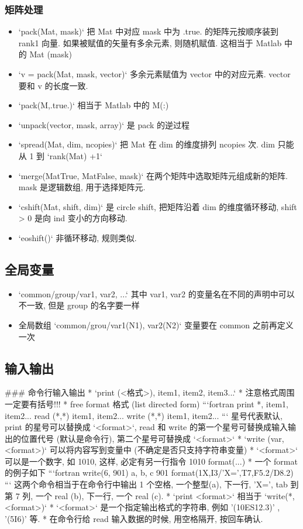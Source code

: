 \subsubsection{矩阵处理}
\begin{itemize}
\item `pack(Mat, mask)` 把 Mat 中对应 mask 中为 .true. 的矩阵元按顺序装到 rank1 向量. 如果被赋值的矢量有多余元素, 则随机赋值. 这相当于 Matlab 中的 Mat (mask)
\item `v = pack(Mat, mask, vector)` 多余元素赋值为 vector 中的对应元素. vector 要和 v 的长度一致.
\item `pack(M,.true.)` 相当于 Matlab 中的 M(:)
\item `unpack(vector, mask, array)` 是 pack 的逆过程
\item `spread(Mat, dim, ncopies)` 把 Mat 在 dim 的维度排列 ncopies 次. dim 只能从 1 到 `rank(Mat) +1`
\item `merge(MatTrue, MatFalse, mask)` 在两个矩阵中选取矩阵元组成新的矩阵. mask 是逻辑数组, 用于选择矩阵元.
\item `cshift(Mat, shift, dim)` 是 circle shift, 把矩阵沿着 dim 的维度循环移动, shift > 0 是向 ind 变小的方向移动.
\item `eoshift()` 非循环移动, 规则类似.
\end{itemize}

\subsection{全局变量}
\begin{itemize}
\item `common/group/var1, var2, ...` 其中 var1, var2 的变量名在不同的声明中可以不一致, 但是 group 的名字要一样
\item 全局数组 `common/grou/var1(N1), var2(N2)` 变量要在 common 之前再定义一次
\end{itemize}

\subsection{输入输出}

### 命令行输入输出
* `print (<格式>), item1, item2, item3...`
* 注意格式周围一定要有括号!!!
* free format 格式 (list directed form)
```fortran
   print *, item1, item2...
   read (*,*) item1, item2... 
   write (*,*) item1, item2...
```
   星号代表默认, print 的星号可以替换成 `<format>`, read 和 write 的第一个星号可替换成输入输出的位置代号 (默认是命令行), 第二个星号可替换成 `<format>`
* `write (var, <format>)` 可以将内容写到变量中 (不确定是否只支持字符串变量)
* `<format>` 可以是一个数字, 如 1010, 这样, 必定有另一行指令 1010 format(...)
* 一个 format 的例子如下
```fortran
write(6, 901) a, b, c
901 format(1X,I3/'X=',T7,F5.2/D8.2)
```
这两个命令相当于在命令行中输出 1 个空格, 一个整型(a), 下一行, 'X=', tab 到第 7 列, 一个 real (b), 下一行, 一个 real (c).
* `print <format>` 相当于 `write(*,<format>)`
* `<format>` 是一个指定输出格式的字符串, 例如 '(10ES12.3)' , '(5I6)' 等.
* 在命令行给 read 输入数据的时候, 用空格隔开, 按回车确认.

